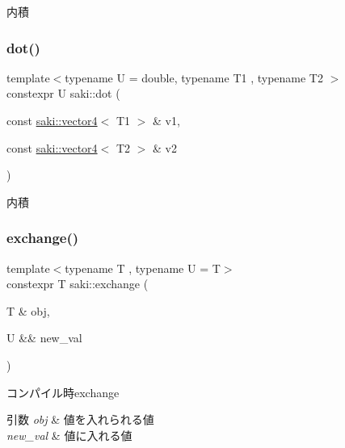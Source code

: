 内積 

\mbox{\label{namespacesaki_a990ff61a01d4cf819df3fe2774842acf}} 
\subsubsection{\texorpdfstring{dot()}{dot()}\hspace{0.1cm}{\footnotesize\ttfamily [3/3]}}
{\footnotesize\ttfamily template$<$typename U  = double, typename T1 , typename T2 $>$ \\
constexpr U saki\+::dot (\begin{DoxyParamCaption}\item[{const \mbox{\hyperlink{classsaki_1_1vector4}{saki\+::vector4}}$<$ T1 $>$ \&}]{v1,  }\item[{const \mbox{\hyperlink{classsaki_1_1vector4}{saki\+::vector4}}$<$ T2 $>$ \&}]{v2 }\end{DoxyParamCaption})}



内積 

\mbox{\label{namespacesaki_ace0188c33098d6ac615fc71e64ab6dda}} 
\subsubsection{\texorpdfstring{exchange()}{exchange()}}
{\footnotesize\ttfamily template$<$typename T , typename U  = T$>$ \\
constexpr T saki\+::exchange (\begin{DoxyParamCaption}\item[{T \&}]{obj,  }\item[{U \&\&}]{new\+\_\+val }\end{DoxyParamCaption})}



コンパイル時exchange 


\begin{DoxyParams}{引数}
{\em obj} & 値を入れられる値 \\
\hline
{\em new\+\_\+val} & 値に入れる値 \\
\hline
\end{DoxyParams}
\mbox{\label{namespacesaki_abc1268e543a60d43b04f1418f5ef3e41}} 
